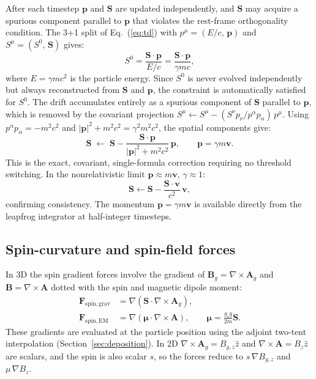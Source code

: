 \documentclass[11pt,a4paper]{article}
\newcommand{\vv}[1]{\mathbf{#1}}
\newcommand{\Ag}{\vv{A}_g}
\begin{document}
After each timestep $\vv{p}$ and $\vv{S}$ are updated independently, and $\vv{S}$ may acquire a spurious component parallel to $\vv{p}$ that violates the rest-frame orthogonality condition.  The 3+1 split of Eq.~(\ref{eq:td}) with $p^\mu = (E/c,\,\vv{p})$ and $S^\mu = (S^0,\,\vv{S})$ gives:
\begin{equation}
  S^0 = \frac{\vv{S}\cdot\vv{p}}{E/c} = \frac{\vv{S}\cdot\vv{p}}{\gamma mc},
\end{equation}
where $E = \gamma mc^2$ is the particle energy.  Since $S^0$ is never evolved independently but always reconstructed from $\vv{S}$ and $\vv{p}$, the constraint is automatically satisfied for $S^0$.  The drift accumulates entirely as a spurious component of $\vv{S}$ parallel to $\vv{p}$, which is removed by the covariant projection $S^\mu \leftarrow S^\mu - (S^\nu p_\nu/p^\alpha p_\alpha)\,p^\mu$.  Using $p^\alpha p_\alpha = -m^2c^2$ and $|\vv{p}|^2 + m^2c^2 = \gamma^2m^2c^2$, the spatial components give:
\begin{equation}
\label{eq:spin_correction}
  \vv{S} \;\leftarrow\; \vv{S} - \frac{\vv{S}\cdot\vv{p}}{|\vv{p}|^2 + m^2c^2}\,\vv{p},
  \qquad \vv{p} = \gamma m\vv{v}.
\end{equation}
This is the exact, covariant, single-formula correction requiring no threshold switching.  In the nonrelativistic limit $\vv{p}\approx m\vv{v}$, $\gamma\approx 1$:
\begin{equation}
  \vv{S} \leftarrow \vv{S} - \frac{\vv{S}\cdot\vv{v}}{c^2}\,\vv{v},
\end{equation}
confirming consistency.  The momentum $\vv{p} = \gamma m\vv{v}$ is available directly from the leapfrog integrator at half-integer timesteps.

\subsection{Spin-curvature and spin-field forces}

In 3D the spin gradient forces involve the gradient of $\vv{B}_g = \nabla\times\Ag$ and $\vv{B} = \nabla\times\vv{A}$ dotted with the spin and magnetic dipole moment:
\begin{align}
  \vv{F}_{\mathrm{spin,grav}} &= \nabla(\vv{S}\cdot\nabla\times\Ag), \\
  \vv{F}_{\mathrm{spin,EM}}   &= \nabla(\boldsymbol{\mu}\cdot\nabla\times\vv{A}), \qquad \boldsymbol{\mu} = \frac{g_s q}{2m}\vv{S}.
\end{align}
These gradients are evaluated at the particle position using the adjoint two-tent interpolation (Section~\ref{sec:deposition}).  In 2D $\nabla\times\Ag = B_{g,z}\hat{z}$ and $\nabla\times\vv{A} = B_z\hat{z}$ are scalars, and the spin is also scalar $s$, so the forces reduce to $s\,\nabla B_{g,z}$ and $\mu\,\nabla B_z$.
\end{document}

